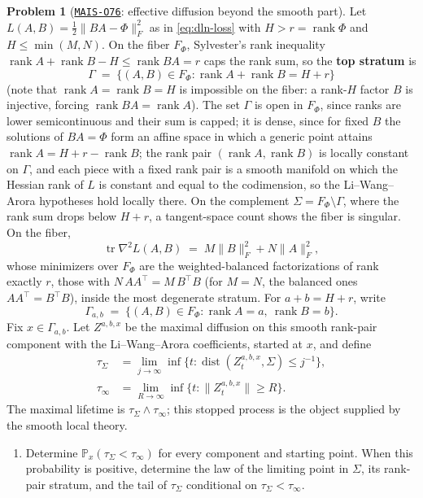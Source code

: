 \documentclass[11pt]{amsart}
\newcommand{\Oid}[1]{\href{https://github.com/lionellevine/MAIS/blob/main/open-problems/MAIS-O#1.md}{\texttt{MAIS-O#1}}}
\theoremstyle{plain}
\theoremstyle{definition}
\newtheorem{problem}[theorem]{Problem}
\newcommand{\dist}{\operatorname{dist}}
\newcommand{\rank}{\operatorname{rank}}
\newcommand{\tr}{\operatorname{tr}}
\begin{document}
\begin{problem}[\Oid{76}: effective diffusion beyond the smooth part]\label{prob:katzenberger}
Let $L(A, B) = \tfrac12 \| BA - \Phi \|_F^2$ as in \eqref{eq:dln-loss} with $H > r = \rank \Phi$ and $H \le \min(M, N)$. On the fiber $F_\Phi$, Sylvester's rank inequality $\rank A + \rank B - H \le \rank BA = r$ caps the rank sum, so the \textbf{top stratum} is
\[
   \Gamma \;=\; \{ (A,B) \in F_\Phi : \rank A + \rank B = H + r \}
\]
(note that $\rank A = \rank B = H$ is impossible on the fiber: a rank-$H$ factor $B$ is injective, forcing $\rank BA = \rank A$). The set $\Gamma$ is open in $F_\Phi$, since ranks are lower semicontinuous and their sum is capped; it is dense, since for fixed $B$ the solutions of $BA = \Phi$ form an affine space in which a generic point attains $\rank A = H + r - \rank B$; the rank pair $(\rank A, \rank B)$ is locally constant on $\Gamma$, and each piece with a fixed rank pair is a smooth manifold on which the Hessian rank of $L$ is constant and equal to the codimension, so the Li--Wang--Arora hypotheses hold locally there. On the complement $\Sigma = F_\Phi \setminus \Gamma$, where the rank sum drops below $H + r$, a tangent-space count shows the fiber is singular. On the fiber,
\[
   \tr \nabla^2 L(A, B) \;=\; M \| B \|_F^2 + N \| A \|_F^2 ,
\]
whose minimizers over $F_\Phi$ are the weighted-balanced factorizations of rank exactly $r$, those with $N \, A A^\top = M \, B^\top B$ (for $M = N$, the balanced ones $A A^\top = B^\top B$), inside the most degenerate stratum.
For $a+b=H+r$, write
\[
   \Gamma_{a,b}
   \;=\;
   \{(A,B)\in F_\Phi:\rank A=a,\ \rank B=b\}.
\]
Fix $x\in\Gamma_{a,b}$. Let $Z^{a,b,x}$ be the maximal diffusion on this smooth rank-pair component with the Li--Wang--Arora coefficients, started at $x$, and define
\[
   \begin{aligned}
   \tau_\Sigma
   &=
   \lim_{j\to\infty}\inf\{t:\dist(Z_t^{a,b,x},\Sigma)\le j^{-1}\},\\
   \tau_\infty
   &=
   \lim_{R\to\infty}\inf\{t:\|Z_t^{a,b,x}\|\ge R\}.
   \end{aligned}
\]
The maximal lifetime is $\tau_\Sigma\wedge\tau_\infty$; this stopped process is the object supplied by the smooth local theory.
\begin{enumerate}
\item[(a)] Determine $\mathbb{P}_x(\tau_\Sigma<\tau_\infty)$ for every component and starting point. When this probability is positive, determine the law of the limiting point in $\Sigma$, its rank-pair stratum, and the tail of $\tau_\Sigma$ conditional on $\tau_\Sigma<\tau_\infty$.

\end{enumerate}
\end{problem}
\end{document}
